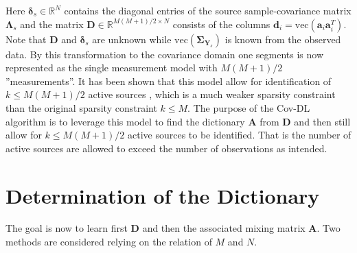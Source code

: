 Here $\boldsymbol{\delta}_s \in \mathbb{R}^{N}$ contains the diagonal entries of the source sample-covariance matrix $\boldsymbol{\Lambda}_s$
and the matrix $\mathbf{D} \in \mathbb{R}^{M(M+1)/2 \times N}$ consists of the columns $\mathbf{d}_i = \text{vec}(\mathbf{a}_i \mathbf{a}_i^T)$. Note that $\mathbf{D}$ and $\boldsymbol{\delta}_s$ are unknown while $\text{vec}(\boldsymbol{\Sigma}_{\mathbf{Y}_s})$ is known from the observed data.
By this transformation to the covariance domain one segments is now represented as the single measurement model with $M(M+1)/2$ ''measurements''. It has been shown that this model allow for identification of $k\leq M(M+1)/2$ active sources \cite{Pal2015}, which is a much weaker sparsity constraint than the original sparsity constraint $k\leq M$. 
The purpose of the Cov-DL algorithm is to leverage this model to find the dictionary $\textbf{A}$ from $\textbf{D}$ and then still allow for $k\leq M(M+1)/2$ active sources to be identified. That is the number of active sources are allowed to exceed the number of observations as intended.

\section{Determination of the Dictionary}
The goal is now to learn first $\textbf{D}$ and then the associated mixing matrix $\textbf{A}$. Two methods are considered relying on the relation of $M$ and $N$.   


